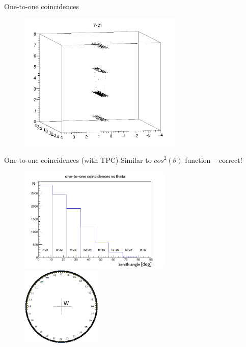 \documentclass{beamer}
\begin{document}
\begin{frame}{One-to-one coincidences}
\begin{figure}
\includegraphics[width=0.7\textwidth]{images/one-to-one.png}
\end{figure}
\end{frame}

\begin{frame}{One-to-one coincidences (with TPC)}
Similar to $cos^2(\theta)$ function -- correct!
\begin{figure}
\includegraphics[width=0.65\textwidth]{images/FluxTheta.png}
\includegraphics[width=0.34\textwidth]{images/nocoin.png}
\end{figure}
\end{frame}
\end{document}
